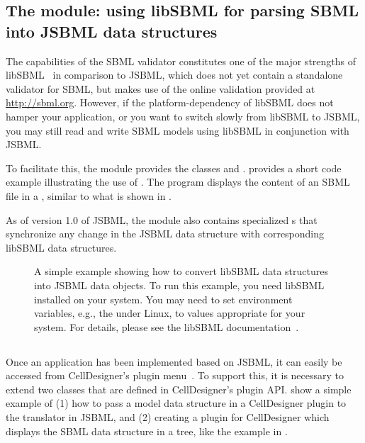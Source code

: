 \subsection{The  module: using libSBML for parsing
  SBML into JSBML data structures}

The capabilities of the SBML validator constitutes one
of the major strengths of libSBML~\citep{Bornstein2008} in comparison to
JSBML, which does not yet contain a standalone validator for SBML, but makes
use of the online validation provided at \url{http://sbml.org}. However, if
the platform-dependency of libSBML does not hamper your application, or you
want to switch slowly from libSBML to JSBML, you may still read and write
SBML models using libSBML in conjunction with JSBML.

To facilitate this, the module  provides the classes
\LibSBMLReader and \LibSBMLWriter.   provides a short
code example illustrating the use of \LibSBMLReader.  The program displays the
content of an SBML file in a \JTree, similar to what is shown in
.

As of version 1.0 of JSBML, the  module also contains
specialized \TreeNodeChangeListener{}s that synchronize any change in the
JSBML data structure with corresponding libSBML data structures.

\begin{figure}[htb]
  
  \caption{A simple example showing how to convert libSBML data structures
    into JSBML data objects.  To run this example, you need libSBML
    installed on your system.  You may need to set environment variables,
    e.g., the 
    under Linux, to values appropriate for your
    system. For details, please see the libSBML
    documentation~\cite{libSBMLwebsite}.}
  \label{lst:LibSBMLio}
\end{figure}


\subsection{}

Once an application has been implemented based on JSBML, it can easily be
accessed from CellDesigner's plugin menu~\citep{Funahashi2003}. To support
this, it is necessary to extend two classes that are defined in
CellDesigner's plugin API. 
show a simple example of (1) how to pass a model
data structure in a CellDesigner plugin to the translator in JSBML, and (2)
creating a plugin for CellDesigner which displays the SBML data structure
in a tree, like the example in .

